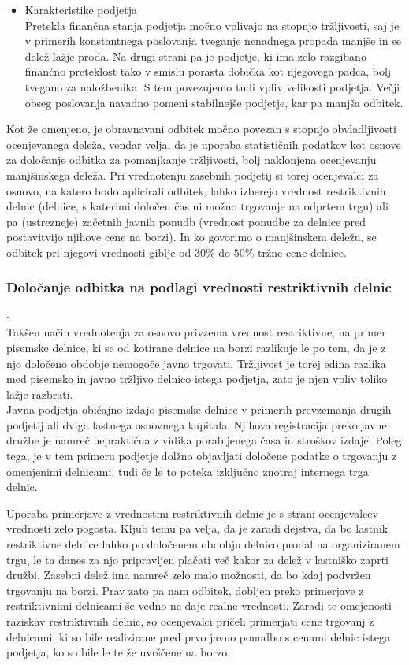 \documentclass[12pt,a4paper]{amsart}
\theoremstyle{definition} %
\theoremstyle{plain} %
\begin{document}
\begin{itemize}
\item Karakteristike podjetja\\
Pretekla finančna stanja podjetja močno vplivajo na stopnjo tržljivosti, saj je v primerih konstantnega poslovanja tveganje nenadnega propada manjše in se delež lažje proda. Na drugi strani pa je podjetje, ki ima zelo razgibano finančno preteklost tako v smislu porasta dobička kot njegovega padca, bolj tvegano za naložbenika. S tem povezujemo tudi vpliv velikosti podjetja. Večji obseg poslovanja navadno pomeni stabilnejše podjetje, kar pa manjša odbitek. 
\end{itemize}
Kot že omenjeno, je obravnavani odbitek močno povezan s stopnjo obvladljivosti ocenjevanega deleža, vendar velja, da je uporaba statističnih podatkov kot osnove za določanje odbitka za pomanjkanje tržljivosti, bolj naklonjena ocenjevanju manjšinskega deleža. Pri vrednotenju zasebnih podjetij si torej ocenjevalci za osnovo, na katero bodo aplicirali odbitek, lahko izberejo vrednost restriktivnih delnic (delnice, s katerimi določen čas ni možno trgovanje na odprtem trgu) ali pa (ustrezneje) začetnih javnih ponudb (vrednost ponudbe za delnice pred postavitvijo njihove cene na borzi). In ko govorimo o manjšinskem deležu, se odbitek pri njegovi vrednosti giblje od $30\%$ do $50\%$ tržne cene delnice.
\subsubsection{Določanje odbitka na podlagi vrednosti restriktivnih delnic}:\\
Takšen način vrednotenja za osnovo privzema vrednost restriktivne, na primer pisemske delnice, ki se od kotirane delnice na borzi razlikuje le po tem, da je z njo določeno obdobje nemogoče javno trgovati. Tržljivost je torej edina razlika med pisemsko in javno tržljivo delnico istega podjetja, zato je njen vpliv toliko lažje razbrati.\\
Javna podjetja običajno izdajo pisemske delnice v primerih prevzemanja drugih podjetij ali dviga lastnega osnovnega kapitala. Njihova registracija preko javne družbe je namreč nepraktična z vidika porabljenega časa in stroškov izdaje. Poleg tega, je v tem primeru podjetje dolžno objavljati določene podatke o trgovanju z omenjenimi delnicami, tudi če le to poteka izključno znotraj internega trga delnic. \par
Uporaba primerjave z vrednostmi restriktivnih delnic je s strani ocenjevalcev vrednosti zelo pogosta. Kljub temu pa velja, da je zaradi dejstva, da bo lastnik restriktivne delnice lahko po določenem obdobju delnico prodal na organiziranem trgu, le ta danes za njo pripravljen plačati več kakor za delež v lastniško zaprti družbi. Zasebni delež ima namreč zelo malo možnosti, da bo kdaj podvržen trgovanju na borzi. Prav zato pa nam odbitek, dobljen preko primerjave z restriktivnimi delnicami še vedno ne daje realne vrednosti. Zaradi te omejenosti raziskav restriktivnih delnic, so ocenjevalci pričeli primerjati cene trgovanj z delnicami, ki so bile realizirane pred prvo javno ponudbo s cenami delnic istega podjetja, ko so bile le te že uvrščene na borzo.
\end{document}
